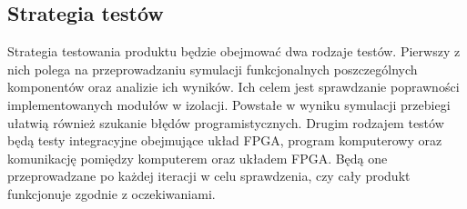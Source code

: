 \subsection{Strategia testów}
Strategia testowania produktu będzie obejmować dwa rodzaje testów. Pierwszy z nich polega na przeprowadzaniu symulacji funkcjonalnych poszczególnych komponentów oraz analizie ich wyników. Ich celem jest sprawdzanie poprawności implementowanych modułów w izolacji. Powstałe w wyniku symulacji przebiegi ułatwią również szukanie błędów programistycznych. Drugim rodzajem testów będą testy integracyjne obejmujące układ FPGA, program komputerowy oraz komunikację pomiędzy komputerem oraz układem FPGA. Będą one przeprowadzane po każdej iteracji w celu sprawdzenia, czy cały produkt funkcjonuje zgodnie z oczekiwaniami.





\newpage